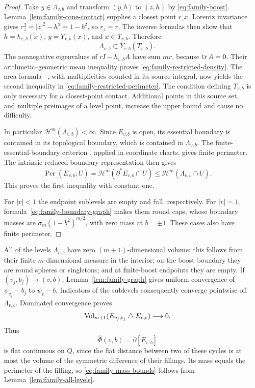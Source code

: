 \begin{proof}
Take $y\in\Lambda_{v,b}$ and transform $(y,b)$ to $(z,h)$ by
\eqref{eq:family-boost}.  Lemma~\ref{lem:family-cone-contact} supplies
a closest point $r_zx$.  Lorentz invariance gives
$r_z^2=|z|^2-h^2=1-b^2$, so $r_z=r$.
The inverse formulas then show that $h=h_{v,b}(x)$,
$y=Y_{v,b}(x)$, and $x\in T_{v,b}$.  Therefore
\begin{equation}\label{eq:family-level-cover}
 \Lambda_{v,b}\subset Y_{v,b}(T_{v,b}).
\end{equation}
The nonnegative eigenvalues of $rI-h_{v,b}A$ have sum $mr$, because
$\operatorname{tr} A=0$.  Their arithmetic--geometric mean inequality proves
\eqref{eq:family-restricted-density}. The area formula
\cite[\S3.2.3]{Federer1969}\ \cite[\S3, pp.~299--300]{Federer1978},
with multiplicities counted in its source
integral, now yields the second inequality in
\eqref{eq:family-restricted-perimeter}.
The condition defining $T_{v,b}$ is only necessary for a closest-point
contact.  Additional points in this source set, and multiple preimages
of a level point, increase the upper bound and cause no difficulty.

In particular $\mathcal H^m(\Lambda_{v,b})<\infty$.
Since $E_{v,b}$ is open, its essential boundary is contained in its
topological boundary, which is contained in $\Lambda_{v,b}$.
The finite-essential-boundary criterion
\cite[\S4, p.~302]{Federer1978}, applied in coordinate charts, gives
finite perimeter. The intrinsic reduced-boundary representation
\cite[\S2.2]{BDFSphere} then gives
\[
 \operatorname{Per}(E_{v,b};U)
 =\mathcal H^m(\partial^*E_{v,b}\cap U)
 \le\mathcal H^m(\Lambda_{v,b}\cap U).
\]
This proves the first inequality with constant one.

For $|v|<1$ the endpoint sublevels are empty and full, respectively.
For $|v|=1$, formula~\eqref{eq:family-boundary-graph} makes them round
caps, whose boundary masses are $\sigma_m(1-b^2)^{m/2}$, with zero
mass at $b=\pm1$.  These cases also have finite perimeter.
\end{proof}

All of the levels $\Lambda_{v,b}$ have zero $(m+1)$-dimensional volume:
this follows from their finite $m$-dimensional measure in the interior;
on the boost boundary they are round spheres or singletons; and at
finite-boost endpoints they are empty.
If $(v_j,b_j)\to(v,b)$, Lemma~\ref{lem:family-graph} gives uniform
convergence of $\psi_{v_j}-b_j$ to $\psi_v-b$.  Indicators of the
sublevels consequently converge pointwise off $\Lambda_{v,b}$.
Dominated convergence proves
\begin{equation}\label{eq:family-filling-continuity}
 \operatorname{Vol}_{m+1}(E_{v_j,b_j}\mathbin\triangle E_{v,b})\longrightarrow0.
\end{equation}
Thus
\[
 \widehat\Phi(v,b)=\partial[E_{v,b}]
\]
is flat continuous on $Q$, since the flat distance between two of these
cycles is at most the volume of the symmetric difference of their
fillings.  Its mass equals the perimeter of the filling, so
\eqref{eq:family-mass-bounds} follows from
Lemma~\ref{lem:family-all-levels}.


